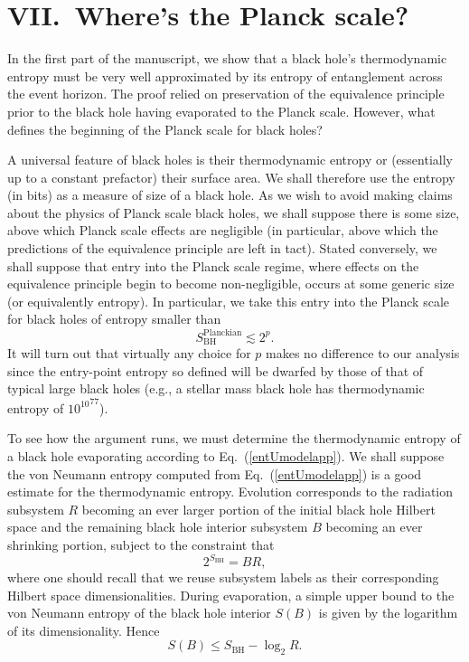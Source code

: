 \documentclass[aps,showpacs,prl,12pt]{revtex4}
\begin{document}
\section{VII.\ Where's the Planck scale?}

In the first part of the manuscript, we show that a black hole's
thermodynamic entropy must be very well approximated by its
entropy of entanglement across the event horizon. The proof relied
on preservation of the equivalence principle prior to the black hole
having evaporated to the Planck scale. However, what defines the
beginning of the Planck scale for black holes? 

A universal feature of black holes is their thermodynamic entropy or
(essentially up to a constant prefactor) their surface area. We shall
therefore use the entropy (in bits) as a measure of size of a black hole.
As we wish to avoid making claims about the physics of Planck scale
black holes, we shall suppose there is some size, above which Planck
scale effects are negligible (in particular, above which the predictions
of the equivalence principle are left in tact). Stated conversely,
we shall suppose that entry into the Planck scale regime, where effects
on the equivalence principle begin to become non-negligible, occurs at
some generic size (or equivalently entropy). In particular, we take this
entry into the Planck scale for black holes of entropy smaller than
\begin{equation}
S_{\text{BH}}^{\text{Planckian}} \lesssim 2^p.
\label{entry}
\end{equation}
It will turn out that virtually any choice for $p$ makes no difference
to our analysis since the entry-point entropy so defined will be
dwarfed by those of that of typical large black holes (e.g.,
a stellar mass black hole has thermodynamic entropy of ${10^{10}}^{77}$).

To see how the argument runs, we must determine the thermodynamic entropy
of a black hole evaporating according to Eq.~(\ref{entUmodelapp}). We shall
suppose the von Neumann entropy computed from Eq.~(\ref{entUmodelapp}) is
a good estimate for the thermodynamic entropy. Evolution corresponds to
the radiation subsystem $R$ becoming an ever larger portion of the
initial black hole Hilbert space and the remaining black hole interior 
subsystem $B$ becoming an ever shrinking portion, subject to the 
constraint that
\begin{equation}
2^{S_{\text{BH}}}=BR,
\end{equation}
where one should recall that we reuse subsystem labels as their 
corresponding Hilbert space dimensionalities. During evaporation, a
simple upper bound to the von Neumann entropy of the black hole interior
$S(B)$ is given by the logarithm of its dimensionality. Hence
\begin{equation}
S(B)\leq S_{\text{BH}} -\log_2 R.
\end{equation}
\end{document}
